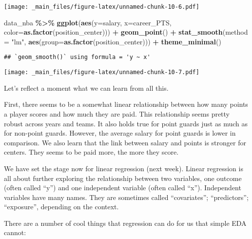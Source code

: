 \documentclass[
]{book}
\newenvironment{Shaded}{\begin{snugshade}}{\end{snugshade}}
\newcommand{\AttributeTok}[1]{\textcolor[rgb]{0.13,0.29,0.53}{#1}}
\newcommand{\FunctionTok}[1]{\textcolor[rgb]{0.13,0.29,0.53}{\textbf{#1}}}
\newcommand{\NormalTok}[1]{#1}
\newcommand{\SpecialCharTok}[1]{\textcolor[rgb]{0.81,0.36,0.00}{\textbf{#1}}}
\newcommand{\StringTok}[1]{\textcolor[rgb]{0.31,0.60,0.02}{#1}}
\begin{document}
\texttt{[image: \_main\_files/figure-latex/unnamed-chunk-10-6.pdf]}

\begin{Shaded}
\begin{Highlighting}[]
\NormalTok{data\_nba }\SpecialCharTok{\%\textgreater{}\%} 
  \FunctionTok{ggplot}\NormalTok{(}\FunctionTok{aes}\NormalTok{(}\AttributeTok{y=}\NormalTok{salary, }\AttributeTok{x=}\NormalTok{career\_PTS, }\AttributeTok{color=}\FunctionTok{as.factor}\NormalTok{(position\_center))) }\SpecialCharTok{+}
    \FunctionTok{geom\_point}\NormalTok{() }\SpecialCharTok{+} 
     \FunctionTok{stat\_smooth}\NormalTok{(}\AttributeTok{method =} \StringTok{"lm"}\NormalTok{,}
                 \FunctionTok{aes}\NormalTok{(}\AttributeTok{group=}\FunctionTok{as.factor}\NormalTok{(position\_center))) }\SpecialCharTok{+} 
       \FunctionTok{theme\_minimal}\NormalTok{()}
\end{Highlighting}
\end{Shaded}

\begin{verbatim}
## `geom_smooth()` using formula = 'y ~ x'
\end{verbatim}

\texttt{[image: \_main\_files/figure-latex/unnamed-chunk-10-7.pdf]}

Let's reflect a moment what we can learn from all this.

First, there seems to be a somewhat linear relationship between how many points
a player scores and how much they are paid. This relationship seems pretty robust across years and teams. It also holds true for point guards just as much as for non-point guards. However, the average salary for point guards is lower in comparison. We also learn that the link between salary and points is stronger for centers. They seems to be paid more, the more they score.

We have set the stage now for linear regression (next week). Linear regression
is all about further exploring the relationship between two variables, one outcome (often called ``y'') and one independent variable (often called ``x''). Independent variables have many names. They are sometimes called ``covariates''; ``predictors''; ``exposure'', depending on the context.

There are a number of cool things that regression can do for us that simple EDA cannot:
\end{document}
